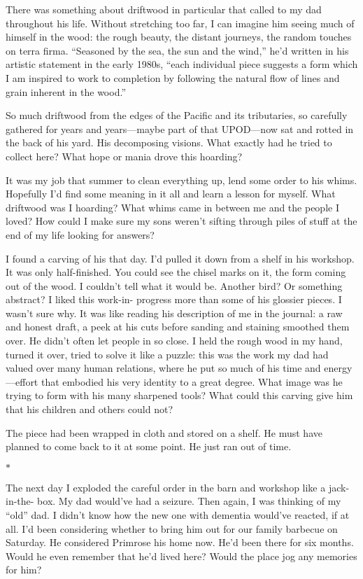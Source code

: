 \documentclass[12pt]{book}
\begin{document}
There was something about driftwood in particular that called to my dad throughout his life. Without stretching too far, I can imagine him seeing much of himself in the wood: the rough beauty, the distant journeys, the random touches on terra firma. ``Seasoned by the sea, the sun and the wind,'' he'd written in his artistic statement in the early 1980s, ``each individual piece suggests a form which I am inspired to work to completion by following the natural flow of lines and grain inherent in the wood.''

So much driftwood from the edges of the Pacific and its tributaries, so carefully gathered for years and years---maybe part of that UPOD---now sat and rotted in the back of his yard. His decomposing visions. What exactly had he tried to collect here? What hope or mania drove this hoarding?

It was my job that summer to clean everything up, lend some order to his whims. Hopefully I'd find some meaning in it all and learn a lesson for myself. What driftwood was I hoarding? What whims came in between me and the people I loved? How could I make sure my sons weren't sifting through piles of stuff at the end of my life looking for answers?

I found a carving of his that day. I'd pulled it down from a shelf in his workshop. It was only half-finished. You could see the chisel marks on it, the form coming out of the wood. I couldn't tell what it would be. Another bird? Or something abstract? I liked this work-in- progress more than some of his glossier pieces. I wasn't sure why. It was like reading his description of me in the journal: a raw and honest draft, a peek at his cuts before sanding and staining smoothed them over. He didn't often let people in so close. I held the rough wood in my hand, turned it over, tried to solve it like a puzzle: this was the work my dad had valued over many human relations, where he put so much of his time and energy---effort that embodied his very identity to a great degree. What image was he trying to form with his many sharpened tools? What could this carving give him that his children and others could not?

The piece had been wrapped in cloth and stored on a shelf. He must have planned to come back to it at some point. He just ran out of time.

\begin{center}$*$\end{center}

The next day I exploded the careful order in the barn and workshop like a jack-in-the- box. My dad would've had a seizure. Then again, I was thinking of my ``old'' dad. I didn't know how the new one with dementia would've reacted, if at all. I'd been considering whether to bring him out for our family barbecue on Saturday. He considered Primrose his home now. He'd been there for six months. Would he even remember that he'd lived here? Would the place jog any memories for him?
\end{document}
